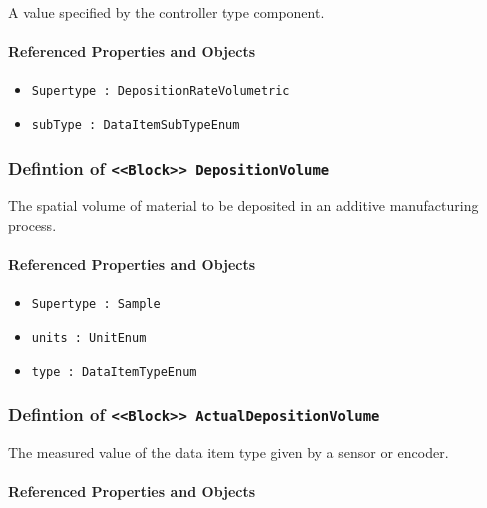\FloatBarrier

A value specified by the controller type component.

\FloatBarrier
\paragraph{Referenced Properties and Objects}

\begin{itemize}
\item \texttt{Supertype : DepositionRateVolumetric}

\item \texttt{subType : DataItemSubTypeEnum}

\end{itemize}
\FloatBarrier
\subsubsection{Defintion of \texttt{<<Block>> DepositionVolume}}
  \label{type:DepositionVolume}

\FloatBarrier

The spatial volume of material to be deposited in an additive manufacturing process.

\FloatBarrier
\paragraph{Referenced Properties and Objects}

\begin{itemize}
\item \texttt{Supertype : Sample}

\item \texttt{units : UnitEnum}

\item \texttt{type : DataItemTypeEnum}

\end{itemize}
\FloatBarrier
\subsubsection{Defintion of \texttt{<<Block>> ActualDepositionVolume}}
  \label{type:ActualDepositionVolume}

\FloatBarrier

The measured value of the data item type given by a sensor or encoder.

\FloatBarrier
\paragraph{Referenced Properties and Objects}

